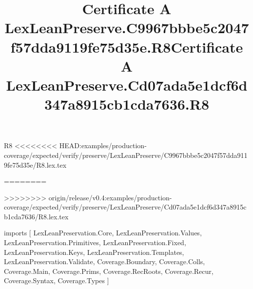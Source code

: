 \begin{lexlean}{R8}
<<<<<<<< HEAD:examples/production-coverage/expected/verify/preserve/LexLeanPreserve/C9967bbbe5c2047f57dda9119fe75d35e/R8.lex.tex
\title{Certificate A LexLeanPreserve.C9967bbbe5c2047f57dda9119fe75d35e.R8}
========
\title{Certificate A LexLeanPreserve.Cd07ada5e1dcf6d347a8915cb1cda7636.R8}
>>>>>>>> origin/release/v0.4:examples/production-coverage/expected/verify/preserve/LexLeanPreserve/Cd07ada5e1dcf6d347a8915cb1cda7636/R8.lex.tex
\begin{coremodule}
imports [
  LexLeanPreservation.Core,
  LexLeanPreservation.Values,
  LexLeanPreservation.Primitives,
  LexLeanPreservation.Fixed,
  LexLeanPreservation.Keys,
  LexLeanPreservation.Templates,
  LexLeanPreservation.Validate,
  Coverage.Boundary,
  Coverage.Colls,
  Coverage.Main,
  Coverage.Prims,
  Coverage.RecRoots,
  Coverage.Recur,
  Coverage.Syntax,
  Coverage.Types
]


\end{coremodule}
\end{lexlean}
